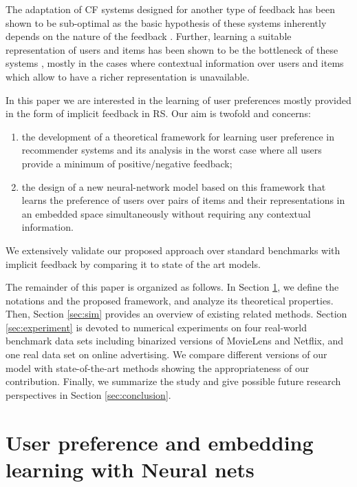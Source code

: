 \documentclass[10pt,journal,compsoc]{IEEEtran}
\begin{document}
\begin{sloppypar}
The adaptation of CF systems designed for another type of feedback has been shown to be sub-optimal as the basic hypothesis of these systems inherently depends on the nature of the feedback \cite{ir2004010}. Further, learning a suitable representation of users and items has been shown to be the bottleneck of these systems \cite{DBLP:conf/kdd/WangWY15}, mostly in the cases where contextual information over users and items which allow to have a richer representation is unavailable.

\bigskip

In this paper we are interested in the learning of user preferences mostly provided in the form of implicit feedback in RS. Our aim is twofold and concerns:
\begin{enumerate}
\item the development of a theoretical framework for learning user preference in recommender systems and its analysis in the worst case where all users provide a minimum of positive/negative feedback;
\item the design of a new neural-network model based on this framework that learns the preference of users over pairs of items and their representations in an embedded space simultaneously without requiring any contextual information.
\end{enumerate}

We extensively validate our proposed approach over standard benchmarks with implicit feedback by comparing it to state of the art models.

The remainder of this paper is organized as follows. In Section \ref{sec:model}, we define the notations and the proposed framework, and analyze its theoretical properties. Then, Section \ref{sec:sim} provides an overview of existing related methods.
Section \ref{sec:experiment} is devoted to numerical experiments on four real-world benchmark data sets including binarized versions of MovieLens and Netflix, and one real data set on online advertising. We compare different versions of our model with state-of-the-art methods showing the appropriateness of our contribution. Finally, we summarize the study and give possible future research perspectives in Section \ref{sec:conclusion}.


\section{User preference and embedding learning with Neural nets }\label{sec:model}


\end{sloppypar}
\end{document}
